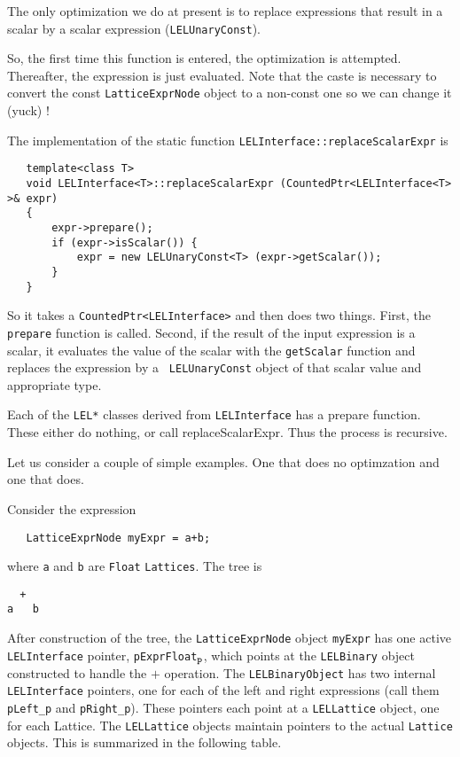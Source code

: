 The only optimization we do at present is to replace expressions
that result in a scalar by a scalar expression ({\tt LELUnaryConst}).

So, the first time this function is entered, the optimization is
attempted.  Thereafter, the expression is just evaluated.  Note that the
caste is necessary to convert the const {\tt LatticeExprNode} object to a
non-const one so we can change it (yuck) !

The implementation of the static function {\tt LELInterface::replaceScalarExpr} is

\begin{verbatim}
   template<class T>
   void LELInterface<T>::replaceScalarExpr (CountedPtr<LELInterface<T> >& expr)
   {
       expr->prepare();
       if (expr->isScalar()) {
           expr = new LELUnaryConst<T> (expr->getScalar());
       }
   }
\end{verbatim}

So it takes a {\tt CountedPtr<LELInterface>} and then does two things. 
First, the {\tt prepare} function is called.  Second, if the result of
the input expression is a scalar, it evaluates the value of the scalar
with the {\tt getScalar} function and replaces the expression by a {\tt
LELUnaryConst} object of that scalar value and appropriate type. 

Each of the {\tt LEL*} classes derived from {\tt LELInterface} has a
prepare function.  These either do nothing, or call replaceScalarExpr. 
Thus the process is recursive. 

Let us consider a couple of simple examples.  One that does no
optimzation and one that does.

Consider the expression 

\begin{verbatim}
   LatticeExprNode myExpr = a+b;
\end{verbatim}

where {\tt a} and {\tt b} are {\tt Float} {\tt Lattices}.  The tree is 

\begin{verbatim}
  +
a   b
\end{verbatim}



After construction of the tree, the {\tt LatticeExprNode} object {\tt myExpr} has
one active {\tt LELInterface} pointer, {\tt pExprFloat}$_{\tt p}$, which points at the
{\tt LELBinary} object constructed to handle the $+$ operation.  The
{\tt LELBinaryObject} has two internal {\tt LELInterface} pointers, one for each of
the left and right expressions (call them {\tt pLeft\_p} and {\tt pRight\_p}).  These
pointers each point at a {\tt LELLattice} object, one for each Lattice.  The
{\tt LELLattice} objects maintain pointers to the actual {\tt Lattice} objects. 
This is summarized in the following table. 


